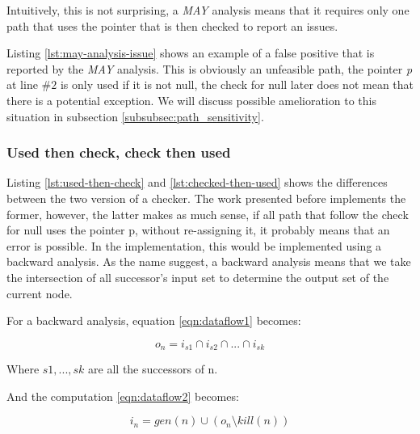 Intuitively, this is not surprising, a \emph{MAY} analysis means that it requires only one path that uses the pointer that is then checked to report an issues. 



Listing \ref{lst:may-analysis-issue} shows an example of a false positive that is reported by the \emph{MAY} analysis. 
This is obviously an unfeasible path, the pointer \emph{p} at line $\#2$ is only used if it is not null, the check for null later does not mean that there is a potential exception.
We will discuss possible amelioration to this situation in subsection \ref{subsubsec:path_sensitivity}.

\subsubsection{Used then check, check then used}
\label{subsubsec:used_then_check_check_then_used}




Listing \ref{lst:used-then-check} and \ref{lst:checked-then-used} shows the differences between the two version of a checker.
The work presented before implements the former, however, the latter makes as much sense, if all path that follow the check for null uses the pointer p, without re-assigning it, it probably means that an error is possible.
In the implementation, this would be implemented using a backward analysis. 
As the name suggest, a backward analysis means that we take the intersection of all successor’s input set to determine the output set of the current node. 

For a backward analysis, equation \ref{eqn:dataflow1} becomes:

\begin{equation}\label{eqn:checkthenused1}
o_{n} = i_{s1}  \cap   i_{s2}  \cap  ... \cap   i_{sk}
\end{equation}

Where $s1, ..., sk$ are all the successors of n.

And the computation \ref{eqn:dataflow2} becomes:

\begin{equation}\label{eqn:checkthenused2}
i_{n} = gen(n)  \cup   (o_{n} \setminus kill(n))
\end{equation}

